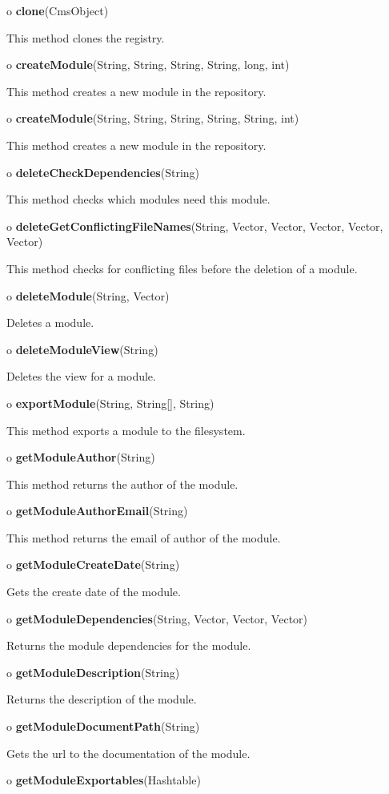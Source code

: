 \begin{description}
\item o {\bf clone}(CmsObject)  

This method clones the registry.  
\item o {\bf createModule}(String, String, String, String, long, int)  

This method creates a new module in the repository.  
\item o {\bf createModule}(String, String, String, String, String, int)  

This method creates a new module in the repository.  
\item o {\bf deleteCheckDependencies}(String)  

This method checks which modules need this module.  
\item o {\bf deleteGetConflictingFileNames}(String, Vector, Vector, Vector,
Vector, Vector)  

This method checks for conflicting files before the deletion of a module.  
\item o {\bf deleteModule}(String, Vector)  

Deletes a module.  
\item o {\bf deleteModuleView}(String)  

Deletes the view for a module.  
\item o {\bf exportModule}(String, String[], String)  

This method exports a module to the filesystem.  
\item o {\bf getModuleAuthor}(String)  

This method returns the author of the module.  
\item o {\bf getModuleAuthorEmail}(String)  

This method returns the email of author of the module.  
\item o {\bf getModuleCreateDate}(String)  

Gets the create date of the module.  
\item o {\bf getModuleDependencies}(String, Vector, Vector, Vector)  

Returns the module dependencies for the module.  
\item o {\bf getModuleDescription}(String)  

Returns the description of the module.  
\item o {\bf getModuleDocumentPath}(String)  

Gets the url to the documentation of the module.  
\item o {\bf getModuleExportables}(Hashtable)  


\end{description}
